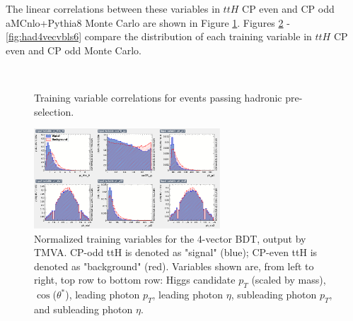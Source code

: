 The linear correlations between these variables in $ttH$ CP even and CP odd aMCnlo+Pythia8 Monte Carlo are shown in Figure \ref{fig:hadcorr4vec}.  Figures \ref{fig:had4vecvbls1} - \ref{fig:had4vecvbls6} compare the distribution of each training variable in $ttH$ CP even and CP odd Monte Carlo.

\begin{figure}[htbp]
  \centering
    \\
  \caption{Training variable correlations for events passing hadronic pre-selection.}
  \label{fig:hadcorr4vec}
\end{figure}

\begin{figure}[htbp]
  \centering
  	\includegraphics[width=0.62\textwidth]{figures/TMVABDTStudies/had-vbls4vec/had4vecvbls1.png}
  \caption{Normalized training variables for the 4-vector BDT, output by TMVA. CP-odd ttH is denoted as "signal" (blue); CP-even ttH is denoted as "background" (red). Variables shown are, from left to right, top row to bottom row: Higgs candidate $p_{T}$ (scaled by mass), $\cos$($\theta^{*}$), leading photon $p_{T}$, leading photon $\eta$, subleading photon $p_{T}$, and subleading photon $\eta$.}
  \label{fig:had4vecvbls1}
\end{figure}

